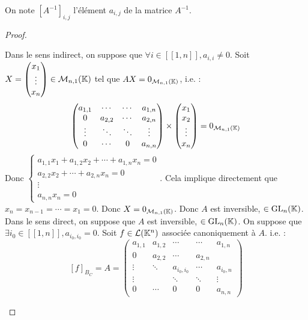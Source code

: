 \documentclass[12pt, a4paper]{report}
\begin{document}
\begin{remark}
    On note $[A^{-1}]_{i,j}$ l'élément $a_{i,j}$ de la matrice $A^{-1}$.
\end{remark}

\begin{proof}
    \begin{outline}
        \1[$\impliedby$] Dans le sens indirect, on suppose que $\forall i \in [\![1,n]\!], a_{i,i} \ne 0$.
        \2 Soit $X = \left(\begin{matrix} x_1 \\ \vdots \\ x_n \end{matrix}\right) \in \mathcal M_{n,1}(\mathbb{K})$ tel que $AX = 0_{\mathcal M_{n,1}(\mathbb{K})}$, i.e. :
        $$\left(\begin{matrix} a_{1,1} & \cdots & \cdots & a_{1,n} \\ 0 & a_{2,2} & \cdots & a_{2,n} \\ \vdots & \ddots & \ddots & \vdots \\ 0 & \cdots & 0 & a_{n,n} \end{matrix}\right) \times \left(\begin{matrix} x_1 \\ x_2 \\ \vdots \\ x_n \end{matrix}\right) = 0_{\mathcal M_{n,1}(\mathbb{K})}$$
        \2 Donc $\begin{cases} a_{1,1} x_1 + a_{1,2} x_2 + \cdots + a_{1,n} x_n = 0 \\ a_{2,2} x_2 + \cdots + a_{2,n} x_n = 0 \\ \vdots \\ a_{n,n} x_n = 0 \end{cases}$.
        \2 Cela implique directement que $x_n = x_{n-1} = \cdots = x_1 = 0$.
        \2 Donc $X = 0_{\mathcal M_{n,1}(\mathbb{K})}$.
        \2 Donc $A$ est inversible, $\in \mathrm{GL}_n(\mathbb{K})$.
        \1[$\implies$] Dans le sens direct, on suppose que $A$ est inversible, $\in \mathrm{GL}_n(\mathbb{K})$.
        \2 On suppose que $\exists i_0 \in [\![1,n]\!], a_{i_0,i_0} = 0$.
        \2 Soit $f \in \mathcal L(\mathbb{K}^n)$ associée canoniquement à $A$. i.e. :
        $$[f]_{B_C} = A = \left(\begin{matrix} a_{1,1} & a_{1,2} & \cdots & \cdots & a_{1,n} \\ 0 & a_{2,2} & \cdots & a_{2,n} \\ \vdots & \ddots & a_{i_0,i_0} & \cdots & a_{i_0,n} \\ \vdots & & \ddots & \ddots & \vdots \\ 0 & \cdots & 0 & 0 & a_{n,n} \end{matrix}\right)$$

\end{outline}
\end{proof}
\end{document}
